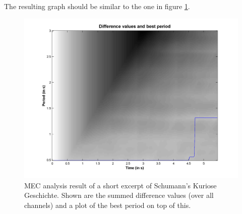 The resulting graph should be similar to the one in figure
\ref{Fig:RhMDifferenceValuesSchumannn}.

\begin{figure}[h]
    \centering
    \includegraphics[width=\IPEMDefaultFigureWidth]{Graphics/RhMDifferenceValuesSchumannn}
    \caption{MEC analysis result of a short excerpt of Schumann's Kuriose Geschichte. Shown are the summed difference values (over all channels) and a plot of the best period on top of this.}
    \label{Fig:RhMDifferenceValuesSchumannn}
\end{figure}
